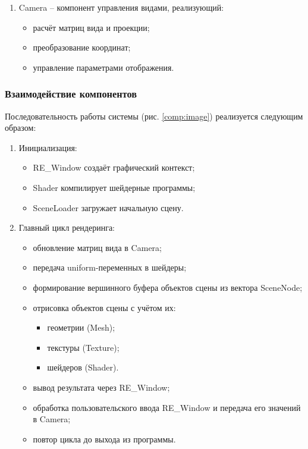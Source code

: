 \begin{enumerate}
    \item Camera -- компонент управления видами, реализующий:

    \begin{itemize}[itemindent=\parindent,leftmargin=\parindent]
        \item расчёт матриц вида и проекции;
        \item преобразование координат;
        \item управление параметрами отображения.
    \end{itemize}
\end{enumerate}

\subsubsection{Взаимодействие компонентов}

Последовательность работы системы (рис. \ref{comp:image}) реализуется следующим образом:

\begin{enumerate}
    \item Инициализация:

    \begin{itemize}[itemindent=\parindent,leftmargin=\parindent]
        \item RE\_Window создаёт графический контекст;
        \item Shader компилирует шейдерные программы;
        \item SceneLoader загружает начальную сцену.
    \end{itemize}

    \item Главный цикл рендеринга:

    \begin{itemize}[itemindent=\parindent,leftmargin=\parindent]
        \item обновление матриц вида в Camera;
        \item передача uniform-переменных в шейдеры;
        \item формирование вершинного буфера объектов сцены из вектора SceneNode;
        \item отрисовка объектов сцены с учётом их:

        \begin{itemize}[itemindent=\parindent,leftmargin=\parindent]
            \item геометрии (Mesh);
            \item текстуры (Texture);
            \item шейдеров (Shader).
        \end{itemize}

        \item вывод результата через RE\_Window;
        \item обработка пользовательского ввода RE\_Window и передача его значений в Camera;
        \item повтор цикла до выхода из программы.
    \end{itemize}
\end{enumerate}

